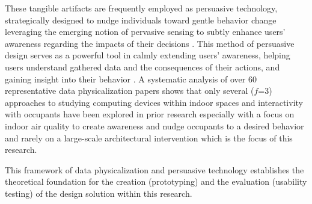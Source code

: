 These tangible artifacts are frequently employed as persuasive technology, strategically designed to nudge individuals toward gentle behavior change leveraging the emerging notion of pervasive sensing to subtly enhance users' awareness regarding the impacts of their decisions \cite{bader_windowwall_2019, rogers_ambient_2010}. This method of persuasive design serves as a powerful tool in calmly extending users' awareness, helping users understand gathered data and the consequences of their actions, and gaining insight into their behavior \cite{bae_making_2022}. A systematic analysis of over 60 representative data physicalization papers \cite{sauve_physecology_2022} shows that only several ($f$=3) approaches to studying computing devices within indoor spaces and interactivity with occupants have been explored in prior research especially with a focus on indoor air quality to create awareness and nudge occupants to a desired behavior and rarely on a large-scale architectural intervention which is the focus of this research.

This framework of data physicalization and persuasive technology establishes the theoretical foundation for the creation (prototyping) and the evaluation (usability testing) of the design solution within this research.